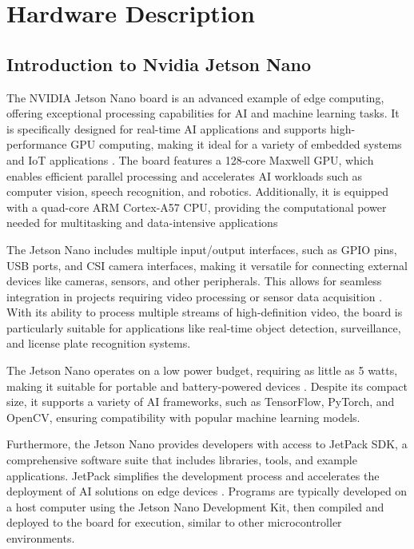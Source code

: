 %
%

\chapter{Hardware Description}

\section{Introduction to Nvidia Jetson Nano}

The NVIDIA Jetson Nano board is an advanced example of edge computing, offering exceptional processing capabilities for AI and machine learning tasks. It is specifically designed for real-time AI applications and supports high-performance GPU computing, making it ideal for a variety of embedded systems and IoT applications \cite{NVI:2019}. The board features a 128-core Maxwell GPU, which enables efficient parallel processing and accelerates AI workloads such as computer vision, speech recognition, and robotics. Additionally, it is equipped with a quad-core ARM Cortex-A57 CPU, providing the computational power needed for multitasking and data-intensive applications \cite{NVI:2021}

The Jetson Nano includes multiple input/output interfaces, such as GPIO pins, USB ports, and CSI camera interfaces, making it versatile for connecting external devices like cameras, sensors, and other peripherals. This allows for seamless integration in projects requiring video processing or sensor data acquisition \cite{NPD:2023}. With its ability to process multiple streams of high-definition video, the board is particularly suitable for applications like real-time object detection, surveillance, and license plate recognition systems.

The Jetson Nano operates on a low power budget, requiring as little as 5 watts, making it suitable for portable and battery-powered devices \cite{NVI:2021}. Despite its compact size, it supports a variety of AI frameworks, such as TensorFlow, PyTorch, and OpenCV, ensuring compatibility with popular machine learning models.

Furthermore, the Jetson Nano provides developers with access to JetPack SDK, a comprehensive software suite that includes libraries, tools, and example applications. JetPack simplifies the development process and accelerates the deployment of AI solutions on edge devices \cite{NVJ:2023}. Programs are typically developed on a host computer using the Jetson Nano Development Kit, then compiled and deployed to the board for execution, similar to other microcontroller environments.

